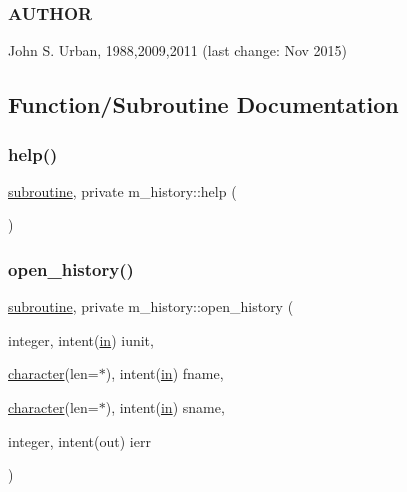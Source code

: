 \subsubsection*{A\+U\+T\+H\+OR}

John S. Urban, 1988,2009,2011 (last change\+: Nov 2015) 

\subsection{Function/\+Subroutine Documentation}
\mbox{\label{namespacem__history_a8d0830530f10435242fa57853baad282}} 
\subsubsection{\texorpdfstring{help()}{help()}}
{\footnotesize\ttfamily \hyperlink{M__stopwatch_83_8txt_acfbcff50169d691ff02d4a123ed70482}{subroutine}, private m\+\_\+history\+::help (\begin{DoxyParamCaption}{ }\end{DoxyParamCaption})\hspace{0.3cm}{\ttfamily [private]}}

\mbox{\label{namespacem__history_ac181d59688bc06d4ba7465841721e766}} 
\subsubsection{\texorpdfstring{open\+\_\+history()}{open\_history()}}
{\footnotesize\ttfamily \hyperlink{M__stopwatch_83_8txt_acfbcff50169d691ff02d4a123ed70482}{subroutine}, private m\+\_\+history\+::open\+\_\+history (\begin{DoxyParamCaption}\item[{integer, intent(\hyperlink{M__journal_83_8txt_afce72651d1eed785a2132bee863b2f38}{in})}]{iunit,  }\item[{\hyperlink{option__stopwatch_83_8txt_abd4b21fbbd175834027b5224bfe97e66}{character}(len=$\ast$), intent(\hyperlink{M__journal_83_8txt_afce72651d1eed785a2132bee863b2f38}{in})}]{fname,  }\item[{\hyperlink{option__stopwatch_83_8txt_abd4b21fbbd175834027b5224bfe97e66}{character}(len=$\ast$), intent(\hyperlink{M__journal_83_8txt_afce72651d1eed785a2132bee863b2f38}{in})}]{sname,  }\item[{integer, intent(out)}]{ierr }\end{DoxyParamCaption})\hspace{0.3cm}{\ttfamily [private]}}



